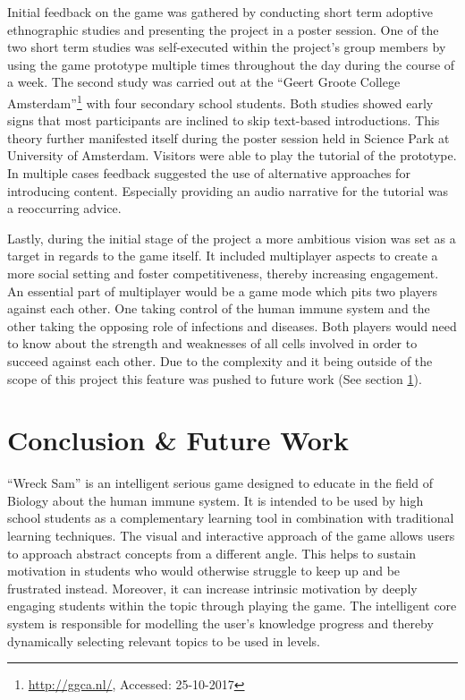 Initial feedback on the game was gathered by conducting short term adoptive ethnographic studies and presenting the project in a poster session. One of the two short term studies was self-executed within the project's group members by using the game prototype multiple times throughout the day during the course of a week. The second study was carried out at the \enquote{Geert Groote College Amsterdam}\footnote{\url{http://ggca.nl/}, Accessed: 25-10-2017} with four secondary school students. Both studies showed early signs that most participants are inclined to skip text-based introductions. This theory further manifested itself during the poster session held in Science Park at University of Amsterdam. Visitors were able to play the tutorial of the prototype. In multiple cases feedback suggested the use of alternative approaches for introducing content. Especially providing an audio narrative for the tutorial was a reoccurring advice.

Lastly, during the initial stage of the project a more ambitious vision was set as a target in regards to the game itself. It included multiplayer aspects to create a more social setting and foster competitiveness, thereby increasing engagement. An essential part of multiplayer would be a game mode which pits two players against each other. One taking control of the human immune system and the other taking the opposing role of infections and diseases. Both players would need to know about the strength and weaknesses of all cells involved in order to succeed against each other. Due to the complexity and it being outside of the scope of this project this feature was pushed to future work (See section \ref{future-work}).

\section{Conclusion \& Future Work} \label{future-work}
\enquote{Wreck Sam} is an intelligent serious game designed to educate in the field of Biology about the human immune system. It is intended to be used by high school students as a complementary learning tool in combination with traditional learning techniques. The visual and interactive approach of the game allows users to approach abstract concepts from a different angle. This helps to sustain motivation in students who would otherwise struggle to keep up and be frustrated instead. Moreover, it can increase intrinsic motivation by deeply engaging students within the topic through playing the game. The intelligent core system is responsible for modelling the user's knowledge progress and thereby dynamically selecting relevant topics to be used in levels.

